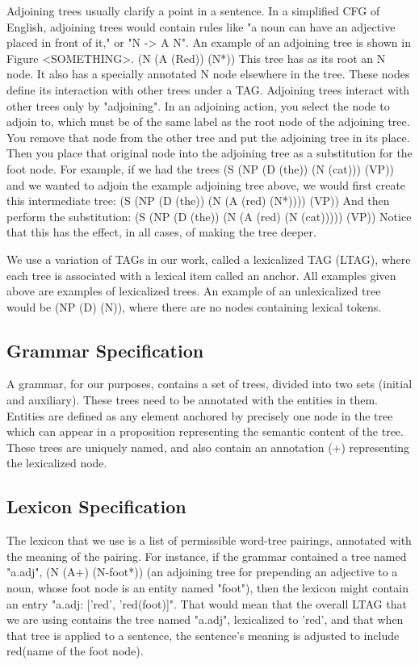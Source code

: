 Adjoining trees usually clarify a point in a sentence.  In a simplified CFG of English, adjoining
trees would contain rules like "a noun can have an adjective placed in front of it," or "N -> A N".
An example of an adjoining tree is shown in Figure <SOMETHING>.
(N (A (Red)) (N*))
This tree has as its root an N node.  It also has a specially annotated N node elsewhere in the
tree.  These nodes define its interaction with other trees under a TAG.  Adjoining trees interact
with other trees only by "adjoining".  In an adjoining action, you select the node
to adjoin to, which must be of the same label as the root node of the adjoining tree.  You remove
that node from the other tree and put the adjoining tree in its place.  Then
you place that original node into the adjoining tree as a substitution for the foot node.
For example, if we had the trees
(S (NP (D (the)) (N (cat))) (VP))
and we wanted to adjoin the example adjoining tree above, we would first create this intermediate tree:
(S (NP (D (the)) (N (A (red) (N*)))) (VP))
And then perform the substitution:
(S (NP (D (the)) (N (A (red) (N (cat))))) (VP))
Notice that this has the effect, in all cases, of making the tree deeper.

We use a variation of TAGs in our work, called a lexicalized TAG (LTAG), where each tree is
associated with a lexical item called an anchor.  All examples given above are examples of
lexicalized trees.  An example of an unlexicalized tree would be (NP (D) (N)), where there
are no nodes containing lexical tokens.

\subsection{Grammar Specification}

A grammar, for our purposes, contains a set of trees, divided into two sets (initial and auxiliary).
These trees need to be annotated with the entities in them.  Entities are defined as any element
anchored by precisely one node in the tree which can appear in a proposition representing the
semantic content of the tree.  These trees are uniquely named, and also contain an
annotation (+) representing the lexicalized node.

\subsection{Lexicon Specification}

The lexicon that we use is a list of permissible word-tree pairings, annotated with the meaning of
the pairing.  For instance, if the grammar contained a tree named "a.adj", (N (A+) (N-foot*))
(an adjoining tree for prepending an adjective to a noun, whose foot node is an entity named "foot"),
then the lexicon might contain an entry "a.adj: ['red', 'red(foot)]".  That would mean that the overall
LTAG that we are using contains the tree named "a.adj", lexicalized to 'red', and that when that tree
is applied to a sentence, the sentence's meaning is adjusted to include red(name of the foot node).

